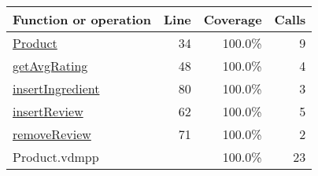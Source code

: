 \bigskip
\begin{longtable}{|l|r|r|r|}
\hline
Function or operation & Line & Coverage & Calls \\
\hline
\hline
\hyperref[Product:34]{Product} & 34&100.0\% & 9 \\
\hline
\hyperref[getAvgRating:48]{getAvgRating} & 48&100.0\% & 4 \\
\hline
\hyperref[insertIngredient:80]{insertIngredient} & 80&100.0\% & 3 \\
\hline
\hyperref[insertReview:62]{insertReview} & 62&100.0\% & 5 \\
\hline
\hyperref[removeReview:71]{removeReview} & 71&100.0\% & 2 \\
\hline
\hline
Product.vdmpp & & 100.0\% & 23 \\
\hline
\end{longtable}

